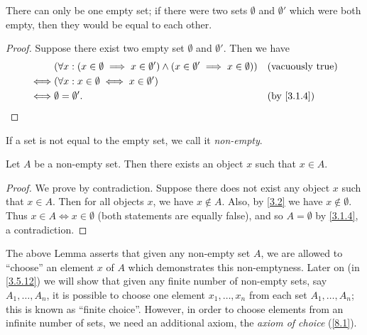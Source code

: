 \begin{ac}\label{ac:3.1.2}
	There can only be one empty set;
	if there were two sets \(\emptyset\) and \(\emptyset'\) which were both empty, then they would be equal to each other.
\end{ac}

\begin{proof}
	Suppose there exist two empty set \(\emptyset\) and \(\emptyset'\).
	Then we have
	\begin{align*}
		     & (\forall x : (x \in \emptyset \implies x \in \emptyset') \land (x \in \emptyset' \implies x \in \emptyset)) &  & \text{(vacuously true)} \\
		\iff & (\forall x : x \in \emptyset \iff x \in \emptyset')                                                                                      \\
		\iff & \emptyset = \emptyset'.                                                                                     &  & \by{3.1.4}
	\end{align*}
\end{proof}

\begin{note}
	If a set is not equal to the empty set, we call it \emph{non-empty}.
\end{note}

\setcounter{thm}{5}
\begin{lem}\label{3.1.6}
	Let \(A\) be a non-empty set.
	Then there exists an object \(x\) such that \(x \in A\).
\end{lem}

\begin{proof}
	We prove by contradiction.
	Suppose there does not exist any object \(x\) such that \(x \in A\).
	Then for all objects \(x\), we have \(x \notin A\).
	Also, by \cref{3.2} we have \(x \notin \emptyset\).
	Thus \(x \in A \iff x \in \emptyset\) (both statements are equally false), and so \(A = \emptyset\) by \cref{3.1.4}, a contradiction.
\end{proof}

\begin{rmk}\label{3.1.7}
	The above Lemma asserts that given any non-empty set \(A\), we are allowed to ``choose'' an element \(x\) of \(A\) which demonstrates this non-emptyness.
	Later on (in \cref{3.5.12}) we will show that given any finite number of non-empty sets, say \(A_1, \dots, A_n\), it is possible to choose one element \(x_1, \dots, x_n\) from each set \(A_1, \dots, A_n\);
	this is known as ``finite choice''.
	However, in order to choose elements from an infinite number of sets, we need an additional axiom, the \emph{axiom of choice} (\cref{8.1}).
\end{rmk}

